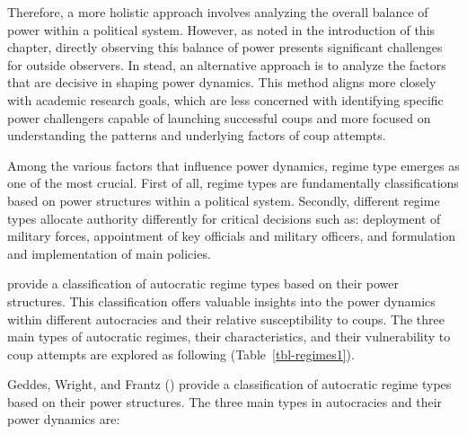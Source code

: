 \documentclass[
  12pt,
]{report}
\begin{document}
Therefore, a more holistic approach involves analyzing the overall
balance of power within a political system. However, as noted in the
introduction of this chapter, directly observing this balance of power
presents significant challenges for outside observers. In stead, an
alternative approach is to analyze the factors that are decisive in
shaping power dynamics. This method aligns more closely with academic
research goals, which are less concerned with identifying specific power
challengers capable of launching successful coups and more focused on
understanding the patterns and underlying factors of coup attempts.

Among the various factors that influence power dynamics, regime type
emerges as one of the most crucial. First of all, regime types are
fundamentally classifications based on power structures within a
political system. Secondly, different regime types allocate authority
differently for critical decisions such as: deployment of military
forces, appointment of key officials and military officers, and
formulation and implementation of main policies.

provide a classification of autocratic regime types based on their power
structures. This classification offers valuable insights into the power
dynamics within different autocracies and their relative susceptibility
to coups. The three main types of autocratic regimes, their
characteristics, and their vulnerability to coup attempts are explored
as following (Table~\ref{tbl-regimes1}).

Geddes, Wright, and Frantz () provide a
classification of autocratic regime types based on their power
structures. The three main types in autocracies and their power dynamics
are:
\end{document}
